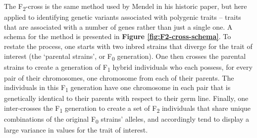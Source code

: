 \documentclass[
]{book}
\begin{document}
The F\textsubscript{2}-cross is the same method used by Mendel in his historic paper, but here applied to identifying genetic variants associated with polygenic traits -- traits that are associated with a number of genes rather than just a single one. A schema for the method is presented in \textbf{Figure \ref{fig:F2-cross-schema}}. To restate the process, one starts with two inbred strains that diverge for the trait of interest (the `parental strains', or F\textsubscript{0} generation). One then crosses the parental strains to create a generation of F\textsubscript{1} hybrid individuals who each possess, for every pair of their chromosomes, one chromosome from each of their parents. The individuals in this F\textsubscript{1} generation have one chromosome in each pair that is genetically identical to their parents with respect to their germ line. Finally, one inter-crosses the F\textsubscript{1} generation to create a set of F\textsubscript{2} individuals that share unique combinations of the original F\textsubscript{0} strains' alleles, and accordingly tend to display a large variance in values for the trait of interest.
\end{document}
